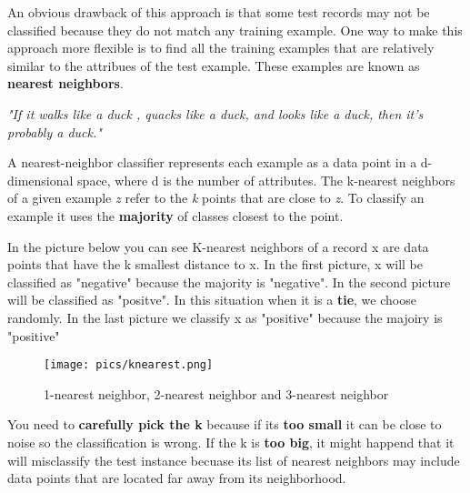		An obvious drawback of this approach is that some test records may not
		be classified because they do not match any training example. 
		One way to make this approach more flexible is to find all the
		training examples that are relatively similar to the attribues of the
		test example. These examples are known as {\bf nearest neighbors}.

		\vspace{0.3cm}
		{\it \Large "If it walks like a duck , quacks like a duck, and looks like a duck,
		then it's probably a duck."}

		\vspace{0.3cm}

		A nearest-neighbor classifier represents each example as a data point
		in a d-dimensional space, where d is the number of attributes. 
		The k-nearest neighbors of a given example {\it z} refer to the
		{\it k} points that are close to {\it z}.
		To classify an example it uses the {\bf majority} of classes closest to the point.

		In the picture below you can see K-nearest neighbors of a record x are data 
		points that have the k smallest distance to x. In the first picture, x will
		be classified as "negative" because the majority is "negative".
		In the second picture will be classified as "positve".
		In this situation when it is a {\bf tie}, we choose randomly. 
		In the last picture	we classify x as "positive" because the majoiry is "positive"
		
		\begin{figure}[H]
			\texttt{[image: pics/knearest.png]}
			\caption{1-nearest neighbor, 2-nearest neighbor and 3-nearest neighbor}
		\end{figure}

		You need to {\bf carefully pick the k} because if its {\bf too small} it can be close to noise
		so the classification is wrong. If the k is {\bf too big}, it might happend that it
		will misclassify the test instance becuase its list of nearest neighbors may include
		data points that are located far away from its neighborhood.

		\clearpage
